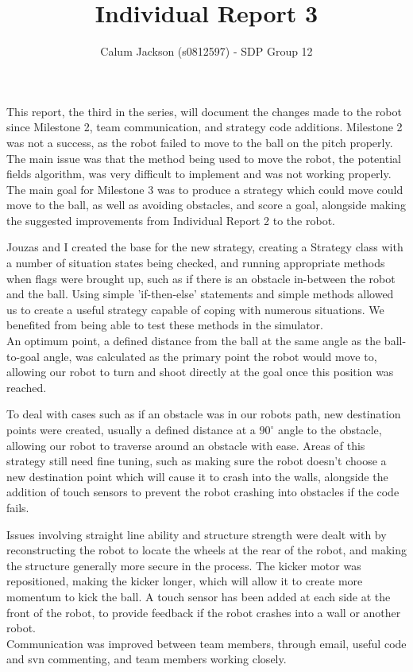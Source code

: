 \documentclass[12pt]{article}
\begin{document}
\title{Individual Report 3}
\author{Calum Jackson (s0812597) - 
SDP Group 12}
\maketitle
\begin{flushleft}

This report, the third in the series, will document the changes made to the robot since Milestone 2, team communication, and strategy code additions. Milestone 2 was not a success, as the robot failed to move to the ball on the pitch properly. The main issue was that the method being used to move the robot, the potential fields algorithm, was very difficult to implement and was not working properly. The main goal for Milestone 3 was to produce a strategy which could move could move to the ball, as well as avoiding obstacles, and score a goal, alongside making the suggested improvements from Individual Report 2 to the robot.\linebreak


Jouzas and I created the base for the new strategy, creating a Strategy class with a number of situation states being checked, and running appropriate methods when flags were brought up, such as if there is an obstacle in-between the robot and the ball. Using simple 'if-then-else' statements and simple methods allowed us to create a useful strategy capable of coping with numerous situations. We benefited from being able to test these methods in the simulator.\\

An optimum point, a defined distance from the ball at the same angle as the ball-to-goal angle, was calculated as the primary point the robot would move to, allowing our robot to turn and shoot directly at the goal once this position was reached.

To deal with cases such as if an obstacle was in our robots path, new destination points were created, usually a defined distance at a $90^{\circ}$ angle to the obstacle, allowing our robot to traverse around an obstacle with ease. Areas of this strategy still need fine tuning, such as making sure the robot doesn't choose a new destination point which will cause it to crash into the walls, alongside the addition of touch sensors to prevent the robot crashing into obstacles if the code fails. \linebreak

Issues involving straight line ability and structure strength were dealt with by reconstructing the robot to locate the wheels at the rear of the robot, and making the structure generally more secure in the process. The kicker motor was repositioned, making the kicker longer, which will allow it to create more momentum to kick the ball. A touch sensor has been added at each side at the front of the robot, to provide feedback if the robot crashes into a wall or another robot. \\

Communication was improved between team members, through email, useful code and svn commenting, and team members working closely. 






\end{flushleft}
\end{document}
